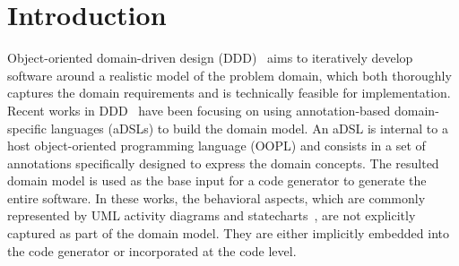 %
\section{Introduction}\label{sect:introduction}
Object-oriented domain-driven design (DDD)~\cite{evans_domain-driven_2004} aims to iteratively develop software around a realistic model of the problem domain, which both thoroughly captures the domain requirements and is technically feasible for implementation.
%
Recent works in DDD~\cite{dan_haywood_apache_2013, paniza_learn_2011} have been focusing on using annotation-based domain-specific languages (aDSLs) to build the domain model. An aDSL is internal to a host object-oriented programming language (OOPL) and consists in a set of annotations specifically designed to express the domain concepts. The resulted domain model is used as the base input for a code generator to generate the entire software. 
%
%
In these works, the behavioral aspects, which are commonly represented by UML activity diagrams and statecharts~\cite{omg_unified_2015}, are not explicitly captured as part of the domain model. They are either implicitly embedded into the code generator or incorporated at the code level. 


